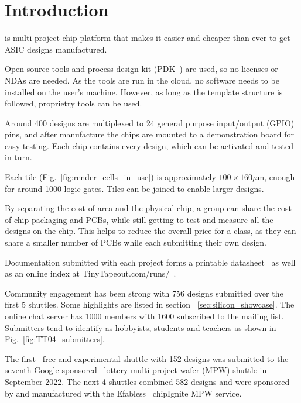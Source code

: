 \section{Introduction}
\label{sec:introduction}
 is multi project chip platform that makes it easier and cheaper than ever to get ASIC designs manufactured.

Open source tools and process design kit (PDK~\cite{pdk}) are used, so no licenses or NDAs are needed. As the tools are run in the cloud, no software needs to be installed on the user's machine. However, as long as the template structure is followed, proprietry tools can be used.

Around 400 designs are multiplexed to 24 general purpose input/output (GPIO) pins, and after manufacture the chips are mounted to a demonstration board for easy testing. Each chip contains every design, which can be activated and tested in turn.

Each tile (Fig.~\ref{fig:render_cells_in_use}) is approximately $100\times 160 \mu \text{m}$, enough for around 1000 logic gates. Tiles can be joined to enable larger designs.

By separating the cost of area and the physical chip, a group can share the cost of chip packaging and PCBs, while still getting to test and measure all the designs on the chip. This helps to reduce the overall price for a class, as they can share a smaller number of PCBs while each submitting their own design.

Documentation submitted with each project forms a printable datasheet~\cite{datasheet} as well as an online index at TinyTapeout.com/runs/~\cite{tinytapeoutruns}.

Community engagement has been strong with 756 designs submitted over the first 5 shuttles. Some highlights are listed in section ~\ref{sec:silicon_showcase}.
The online chat server has 1000 members with 1600 subscribed to the mailing list. Submitters tend to identify as hobbyists, students and teachers as shown in Fig.~\ref{fig:TT04_submitters}.

The first~\cite{firstshuttle} free and experimental shuttle with 152 designs was submitted to the seventh Google sponsored~\cite{googlesponsored} lottery multi project wafer (MPW) shuttle in September 2022.
The next 4 shuttles combined 582 designs and were sponsored by and manufactured with the Efabless~\cite{efabless} chipIgnite MPW service.

